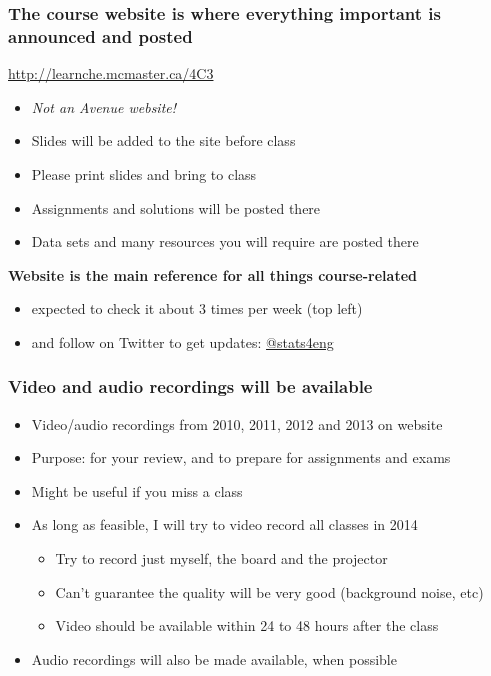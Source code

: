\begin{frame}\frametitle{The course website is where everything important is announced and posted}

	\begin{exampleblock}{}
		\centering
		\href{http://learnche.mcmaster.ca/4C3}{http://learnche.mcmaster.ca/4C3}
	\end{exampleblock}
	\begin{itemize}
		\item	\emph{Not an Avenue website!}
		\item	Slides will be added to the site before class
		\item	Please print slides and bring to class
		\item	Assignments and solutions will be posted there
		\item	Data sets and many resources you will require are posted there
	\end{itemize}
	\vspace{12pt}
	\textbf{ Website is the main reference for all things course-related}
	\begin{itemize}
		\item	expected to check it about 3 times per week {\tiny (top left)}
		\item	and follow on Twitter to get updates: \href{https://twitter.com/stats4eng}{@stats4eng}
	\end{itemize}
\end{frame}

\begin{frame}\frametitle{Video and audio recordings will be available}
	\begin{itemize}
		\item	Video/audio recordings from 2010, 2011, 2012 and 2013 on website
		\item	Purpose: for your review, and to prepare for assignments and exams
		\item	Might be useful if you miss a class
		\item	As long as feasible, I will try to video record all classes in 2014
		\begin{itemize}
			\item	Try to record just myself, the board and the projector
			\item	Can't guarantee the quality will be very good (background noise, etc)
			\item	Video should be available within 24 to 48 hours after the class
		\end{itemize}
		\item	Audio recordings will also be made available, when possible
	\end{itemize}
\end{frame}

